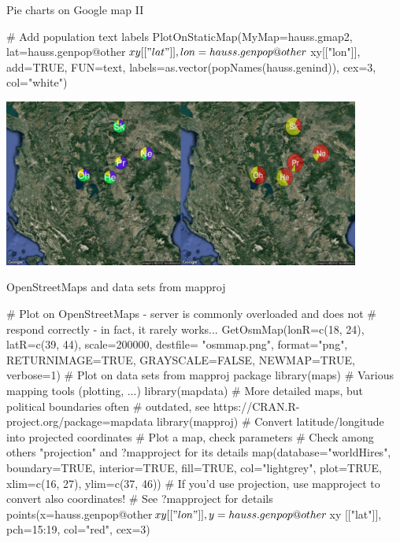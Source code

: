 \documentclass[compress, ucs, xelatex, 11pt, xcolor=svgnames,
  hyperref={
    bookmarks=true,
    unicode=true,
    colorlinks=true,
    pdftitle={Molecular data in R},
    plainpages=false,
    pdfauthor={Vojtech Zeisek},
    pdfsubject={Course about phylogeny and evolution in R},
    pdfcreator={XeLaTeX},
    pdfkeywords={R, evolution, phylogeny, molecular data},
    linkcolor=Tomato,
    anchorcolor=SaddleBrown,
    citecolor=Goldenrod,
    filecolor=DarkMagenta,
    menucolor=Sienna,
    urlcolor=DarkTurquoise,
    pdftex},
  url={hyphens, lowtilde} %
  ]{beamer}
\begin{document}
\begin{frame}[fragile]{Pie charts on Google map II}
  \begin{spluscode}
    # Add population text labels
    PlotOnStaticMap(MyMap=hauss.gmap2, lat=hauss.genpop@other$xy[["lat"]],
      lon=hauss.genpop@other$xy[["lon"]], add=TRUE, FUN=text,
      labels=as.vector(popNames(hauss.genind)), cex=3, col="white")
  \end{spluscode}
  \begin{center}
    \includegraphics[height=5.5cm]{map_pie_google.png}
  \end{center}
\end{frame}

\begin{frame}[fragile]{OpenStreetMaps and data sets from mapproj}
  \begin{spluscode}
    # Plot on OpenStreetMaps - server is commonly overloaded and does not
    # respond correctly - in fact, it rarely works...
    GetOsmMap(lonR=c(18, 24), latR=c(39, 44), scale=200000, destfile=
      "osmmap.png", format="png", RETURNIMAGE=TRUE, GRAYSCALE=FALSE,
      NEWMAP=TRUE, verbose=1)
    # Plot on data sets from mapproj package
    library(maps) # Various mapping tools (plotting, ...)
    library(mapdata) # More detailed maps, but political boundaries often
           # outdated, see https://CRAN.R-project.org/package=mapdata
    library(mapproj) # Convert latitude/longitude into projected coordinates
    # Plot a map, check parameters
    # Check among others "projection" and ?mapproject for its details
    map(database="worldHires", boundary=TRUE, interior=TRUE, fill=TRUE,
      col="lightgrey", plot=TRUE, xlim=c(16, 27), ylim=c(37, 46))
    # If you'd use projection, use mapproject to convert also coordinates!
    # See ?mapproject for details
    points(x=hauss.genpop@other$xy[["lon"]], y=hauss.genpop@other$xy
      [["lat"]], pch=15:19, col="red", cex=3)
  \end{spluscode}
\end{frame}
\end{document}
